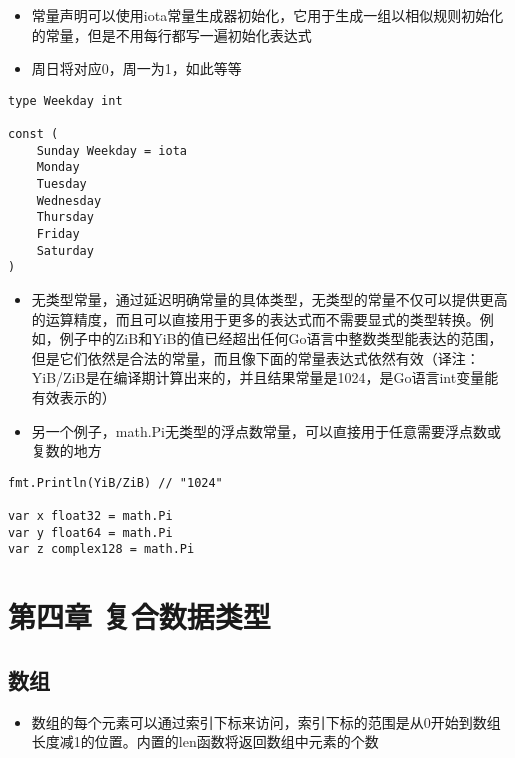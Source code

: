 \begin{itemize}
\tightlist
\item
  常量声明可以使用iota常量生成器初始化，它用于生成一组以相似规则初始化的常量，但是不用每行都写一遍初始化表达式
\item
  周日将对应0，周一为1，如此等等
\end{itemize}

\begin{verbatim}
type Weekday int

const (
    Sunday Weekday = iota
    Monday
    Tuesday
    Wednesday
    Thursday
    Friday
    Saturday
)
\end{verbatim}

\begin{itemize}
\tightlist
\item
  无类型常量，通过延迟明确常量的具体类型，无类型的常量不仅可以提供更高的运算精度，而且可以直接用于更多的表达式而不需要显式的类型转换。例如，例子中的ZiB和YiB的值已经超出任何Go语言中整数类型能表达的范围，但是它们依然是合法的常量，而且像下面的常量表达式依然有效（译注：YiB/ZiB是在编译期计算出来的，并且结果常量是1024，是Go语言int变量能有效表示的）
\item
  另一个例子，math.Pi无类型的浮点数常量，可以直接用于任意需要浮点数或复数的地方
\end{itemize}

\begin{verbatim}
fmt.Println(YiB/ZiB) // "1024"

var x float32 = math.Pi
var y float64 = math.Pi
var z complex128 = math.Pi
\end{verbatim}

\hypertarget{ux7b2cux56dbux7ae0-ux590dux5408ux6570ux636eux7c7bux578b}{%
\section{第四章
复合数据类型}\label{ux7b2cux56dbux7ae0-ux590dux5408ux6570ux636eux7c7bux578b}}

\hypertarget{ux6570ux7ec4}{%
\subsection{数组}\label{ux6570ux7ec4}}

\begin{itemize}
\tightlist
\item
  数组的每个元素可以通过索引下标来访问，索引下标的范围是从0开始到数组长度减1的位置。内置的len函数将返回数组中元素的个数
\end{itemize}


